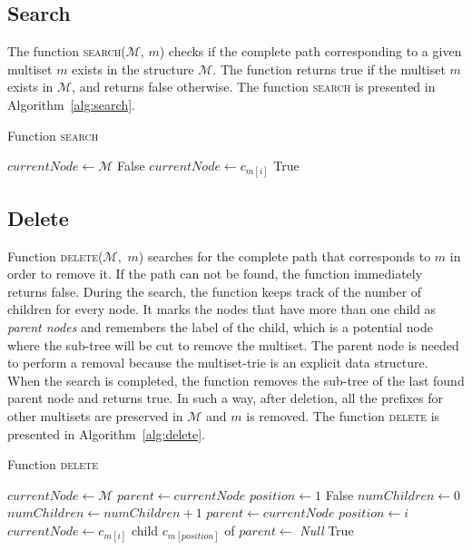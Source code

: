 \subsection{Search}\label{s:search}
The function \textsc{search}($\mathcal{M}$, $m$) checks if the complete path corresponding to 
a given multiset $m$ exists in the structure $\mathcal{M}.$ The function returns 
true if the multiset $m$ exists in $\mathcal{M}$, and returns false otherwise. The 
function \textsc{search} is presented in Algorithm~\ref{alg:search}.

\begin{algorithm}[h!]
\caption{Function \textsc{search}}
\label{alg:search}
\begin{algorithmic}[1]
\State $currentNode \gets \mathcal{M}$
\State \Return False
\EndIf
\State $currentNode \gets c_{m[i]}$
\EndFor
\State \Return True
\EndFunction
\end{algorithmic}
\end{algorithm}

\subsection{Delete} \label{s:delete}
Function \textsc{delete}($\mathcal{M},$ $m$) searches for the complete path 
that corresponds to $m$ in order to remove it. If the path can not be found, the 
function immediately returns false. During the search, the function keeps track of the 
number of children for every node. It marks the nodes that have more than one child 
as \emph{parent nodes} and remembers the label of the child, which is a potential node 
where the sub-tree will be cut to remove the multiset. The parent node is needed to 
perform a removal because the multiset-trie is an explicit data structure. When the search 
is completed, the function removes the sub-tree of the last found parent node and 
returns true. In such a way, after deletion, all the prefixes for other multisets are 
preserved in $\mathcal{M}$ and $m$ is removed. The function \textsc{delete} is 
presented in Algorithm~\ref{alg:delete}.


\begin{algorithm}[h!]
\caption{Function \textsc{delete}}
\label{alg:delete}
\begin{algorithmic}[1]
\State $currentNode \gets \mathcal{M}$
\State $parent \gets currentNode$ 
\State $position \gets 1$
\State \Return False
\EndIf
\State $numChildren \gets 0$
\State $numChildren\gets numChildren+1$
\EndIf
\EndFor
{}
\State $parent\gets currentNode$
\State $position \gets i$
\EndIf
\State $currentNode \gets c_{m[i]}$
\EndFor
\State child $c_{m[position]}$ of $parent\gets$ \emph{Null}
\State \Return True
\EndFunction
\end{algorithmic}
\end{algorithm}

